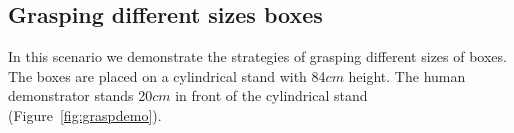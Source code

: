 \subsection{Grasping different sizes boxes}
\label{cha5:sec3:graspsize}
In this scenario we demonstrate the strategies of grasping different sizes of boxes. The boxes are placed on a cylindrical stand with 84$cm$ height. The human demonstrator stands 20$cm$ in front of the cylindrical stand (Figure~\ref{fig:graspdemo}).

\begin{figure}
  \centering

\end{figure}
